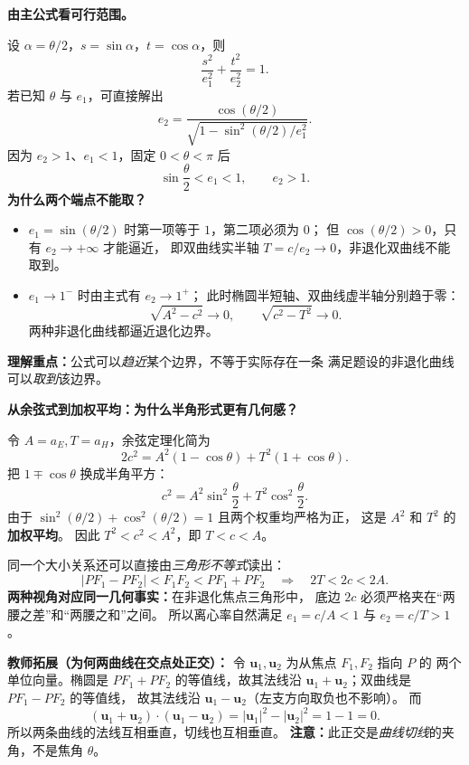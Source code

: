 \clearpage
\begin{explanationbox}
	\textbf{由主公式看可行范围。}
	
\begin{center}

\end{center}
设 $\alpha=\theta/2$，$s=\sin\alpha$，$t=\cos\alpha$，则
	\[
		\frac{s^2}{e_1^2}+\frac{t^2}{e_2^2}=1.
	\]
	若已知 $\theta$ 与 $e_1$，可直接解出
	\[
		\boxed{e_2=\frac{\cos(\theta/2)}{
				\sqrt{1-\sin^2(\theta/2)/e_1^2}}}.
	\]
	因为 $e_2>1$、$e_1<1$，固定 $0<\theta<\pi$ 后
	\[
		\boxed{\sin\frac\theta2<e_1<1},\qquad e_2>1.
	\]
\textbf{为什么两个端点不能取？}
\begin{itemize}
\item $e_1=\sin(\theta/2)$ 时第一项等于 $1$，第二项必须为 $0$；
但 $\cos(\theta/2)>0$，只有 $e_2\to+\infty$ 才能逼近，
即双曲线实半轴 $T=c/e_2\to0$，非退化双曲线不能取到。
\item $e_1\to1^-$ 时由主式有 $e_2\to1^+$；
此时椭圆半短轴、双曲线虚半轴分别趋于零：
\[
\sqrt{A^2-c^2}\to0,\qquad \sqrt{c^2-T^2}\to0.
\]
两种非退化曲线都逼近退化边界。
\end{itemize}
\textbf{理解重点：}公式可以\emph{趋近}某个边界，不等于实际存在一条
满足题设的非退化曲线可以\emph{取到}该边界。
\end{explanationbox}

\clearpage
\begin{explanationbox}
\textbf{从余弦式到加权平均：为什么半角形式更有几何感？}

令 $A=a_E,T=a_H$，余弦定理化简为
\[
2c^2=A^2(1-\cos\theta)+T^2(1+\cos\theta).
\]
把 $1\mp\cos\theta$ 换成半角平方：
\[
\boxed{c^2=A^2\sin^2\frac\theta2+T^2\cos^2\frac\theta2}.
\]
由于 $\sin^2(\theta/2)+\cos^2(\theta/2)=1$ 且两个权重均严格为正，
这是 $A^2$ 和 $T^2$ 的\textbf{加权平均}。
因此 $T^2<c^2<A^2$，即 $T<c<A$。

同一个大小关系还可以直接由\emph{三角形不等式}读出：
\[
|PF_1-PF_2|<F_1F_2<PF_1+PF_2
\quad\Longrightarrow\quad 2T<2c<2A.
\]
\textbf{两种视角对应同一几何事实：}在非退化焦点三角形中，
底边 $2c$ 必须严格夹在“两腰之差”和“两腰之和”之间。
所以离心率自然满足 $e_1=c/A<1$ 与 $e_2=c/T>1$。

\textbf{教师拓展（为何两曲线在交点处正交）：}
令 $\mathbf u_1,\mathbf u_2$ 为从焦点 $F_1,F_2$ 指向 $P$ 的
两个单位向量。椭圆是 $PF_1+PF_2$ 的等值线，故其法线沿
$\mathbf u_1+\mathbf u_2$；双曲线是 $PF_1-PF_2$ 的等值线，
故其法线沿 $\mathbf u_1-\mathbf u_2$（左支方向取负也不影响）。
而
\[
(\mathbf u_1+\mathbf u_2)\cdot(\mathbf u_1-\mathbf u_2)
=|\mathbf u_1|^2-|\mathbf u_2|^2=1-1=0.
\]
所以两条曲线的法线互相垂直，切线也互相垂直。
\textbf{注意：}此正交是\emph{曲线切线}的夹角，不是焦角 $\theta$。
\end{explanationbox}
